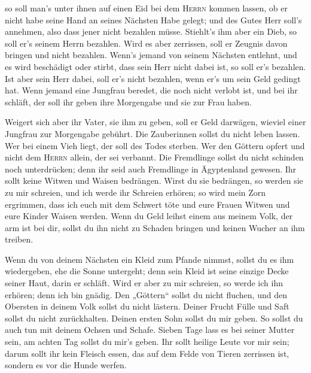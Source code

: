  so soll man's unter ihnen auf einen Eid bei dem
\textsc{Herrn} kommen lassen, ob er nicht habe seine Hand an seines
Nächsten Habe gelegt; und des Gutes Herr soll's annehmen, also dass
jener nicht bezahlen müsse.  Stiehlt's ihm aber ein Dieb,
so soll er's seinem Herrn bezahlen.  Wird es aber
zerrissen, soll er Zeugnis davon bringen und nicht bezahlen.
 Wenn's jemand von seinem Nächsten entlehnt, und es wird
beschädigt oder stirbt, dass sein Herr nicht dabei ist, so soll er's
bezahlen.  Ist aber sein Herr dabei, soll er's nicht
bezahlen, wenn er's um sein Geld gedingt hat.  Wenn
jemand eine Jungfrau beredet, die noch nicht verlobt ist, und bei ihr
schläft, der soll ihr geben ihre Morgengabe und sie zur Frau haben.

 Weigert sich aber ihr Vater, sie ihm zu geben, soll er
Geld darwägen, wieviel einer Jungfrau zur Morgengabe gebührt.
 Die Zauberinnen sollst du nicht leben lassen.
 Wer bei einem Vieh liegt, der soll des Todes sterben.
 Wer den Göttern opfert und nicht dem \textsc{Herrn}
allein, der sei verbannt.  Die Fremdlinge sollst du nicht
schinden noch unterdrücken; denn ihr seid auch Fremdlinge in Ägyptenland
gewesen.  Ihr sollt keine Witwen und Waisen bedrängen.
 Wirst du sie bedrängen, so werden sie zu mir schreien,
und ich werde ihr Schreien erhören;  so wird mein Zorn
ergrimmen, dass ich euch mit dem Schwert töte und eure Frauen Witwen und
eure Kinder Waisen werden.  Wenn du Geld leihst einem aus
meinem Volk, der arm ist bei dir, sollst du ihn nicht zu Schaden bringen
und keinen Wucher an ihm treiben.

 Wenn du von deinem Nächsten ein Kleid zum Pfande nimmst,
sollst du es ihm wiedergeben, ehe die Sonne untergeht; 
denn sein Kleid ist seine einzige Decke seiner Haut, darin er schläft.
Wird er aber zu mir schreien, so werde ich ihn erhören; denn ich bin
gnädig.  Den „Göttern`` sollst du nicht fluchen, und den
Obersten in deinem Volk sollst du nicht lästern.  Deiner
Frucht Fülle und Saft sollst du nicht zurückhalten. Deinen ersten Sohn
sollst du mir geben.  So sollst du auch tun mit deinem
Ochsen und Schafe. Sieben Tage lass es bei seiner Mutter sein, am achten
Tag sollst du mir's geben.  Ihr sollt heilige Leute vor
mir sein; darum sollt ihr kein Fleisch essen, das auf dem Felde von
Tieren zerrissen ist, sondern es vor die Hunde werfen.

